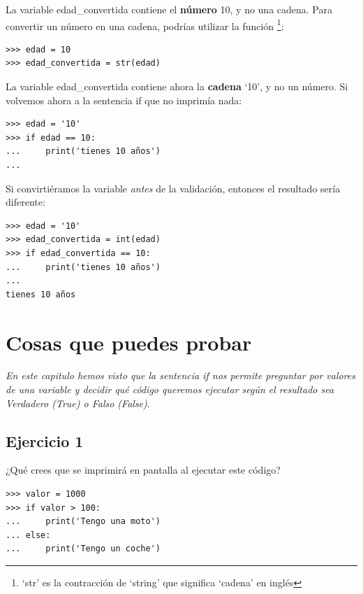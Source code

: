 \noindent
La variable edad\_convertida contiene el \textbf{número} 10, y no una cadena. Para convertir un número en una cadena, podrías utilizar la función \footnote{`str' es la contracción de `string' que significa `cadena' en inglés}:

\begin{listing}
\begin{verbatim}
>>> edad = 10
>>> edad_convertida = str(edad)
\end{verbatim}
\end{listing}

\noindent
La variable edad\_convertida contiene ahora la \textbf{cadena} `10', y no un número.  Si volvemos ahora a la sentencia if que no imprimía nada:

\begin{listing}
\begin{verbatim}
>>> edad = '10'
>>> if edad == 10:
...     print('tienes 10 años')
...
\end{verbatim}
\end{listing}

\noindent
Si convirtiéramos la variable \emph{antes} de la validación, entonces el resultado sería diferente:

\begin{listing}
\begin{verbatim}
>>> edad = '10'
>>> edad_convertida = int(edad)
>>> if edad_convertida == 10:
...     print('tienes 10 años')
...
tienes 10 años
\end{verbatim}
\end{listing}

\section{Cosas que puedes probar}

\emph{En este capitulo hemos visto que la sentencia if nos permite preguntar por valores de una variable y decidir qué código queremos ejecutar según el resultado sea Verdadero (True) o Falso (False)}.

\subsection*{Ejercicio 1}
¿Qué crees que se imprimirá en pantalla al ejecutar este código?

\begin{listing}
\begin{verbatim}
>>> valor = 1000
>>> if valor > 100:
...     print('Tengo una moto')
... else:
...     print('Tengo un coche')
\end{verbatim}
\end{listing}

